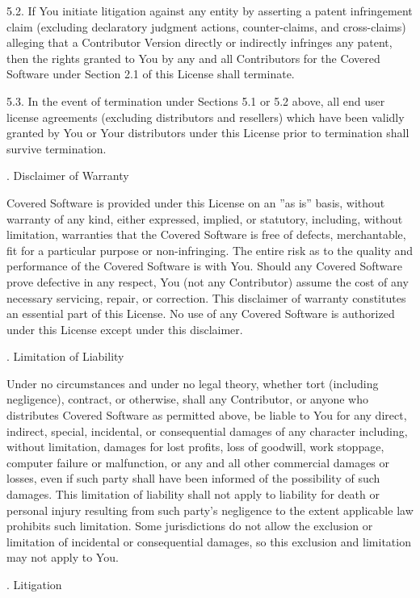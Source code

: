 5.2. If You initiate litigation against any entity by asserting a patent infringement claim (excluding declaratory judgment actions, counter-claims, and cross-claims) alleging that a Contributor Version directly or indirectly infringes any patent, then the rights granted to You by any and all Contributors for the Covered Software under Section 2.1 of this License shall terminate.

5.3. In the event of termination under Sections 5.1 or 5.2 above, all end user license agreements (excluding distributors and resellers) which have been validly granted by You or Your distributors under this License prior to termination shall survive termination.

. Disclaimer of Warranty

Covered Software is provided under this License on an ''as is'' basis, without warranty of any kind, either expressed, implied, or statutory, including, without limitation, warranties that the Covered Software is free of defects, merchantable, fit for a particular purpose or non-infringing. The entire risk as to the quality and performance of the Covered Software is with You. Should any Covered Software prove defective in any respect, You (not any Contributor) assume the cost of any necessary servicing, repair, or correction. This disclaimer of warranty constitutes an essential part of this License. No use of any Covered Software is authorized under this License except under this disclaimer.

. Limitation of Liability

Under no circumstances and under no legal theory, whether tort (including negligence), contract, or otherwise, shall any Contributor, or anyone who distributes Covered Software as permitted above, be liable to You for any direct, indirect, special, incidental, or consequential damages of any character including, without limitation, damages for lost profits, loss of goodwill, work stoppage, computer failure or malfunction, or any and all other commercial damages or losses, even if such party shall have been informed of the possibility of such damages. This limitation of liability shall not apply to liability for death or personal injury resulting from such party’s negligence to the extent applicable law prohibits such limitation. Some jurisdictions do not allow the exclusion or limitation of incidental or consequential damages, so this exclusion and limitation may not apply to You.

. Litigation

